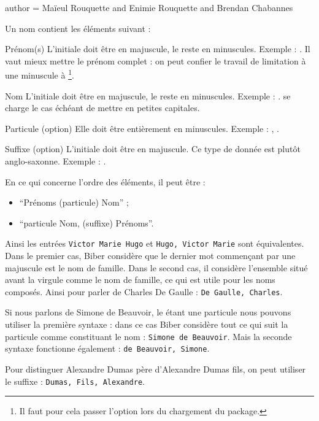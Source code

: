\begin{latexcode}
author = {Maïeul Rouquette and Enimie Rouquette and Brendan Chabannes}
\end{latexcode}

Un nom contient les éléments suivant :
\begin{choix}
	\item[Prénom(s)]L'initiale doit être en majuscule, le reste en minuscules. Exemple : . Il vaut mieux mettre le prénom complet : on peut confier le travail de limitation à une minuscule  à \footnote{Il faut pour cela passer l'option  lors du chargement du package.}.
	\item[Nom]L'initiale doit être en majuscule, le reste en minuscules. Exemple : .  se charge le cas échéant de mettre en petites capitales.
	\item[Particule (option)]Elle doit être entièrement en minuscules. Exemple : , .
	\item[Suffixe (option)]L'initiale doit être en majuscule. Ce type de donnée est plutôt anglo-saxonne. Exemple : .
\end{choix}


En ce qui concerne l'ordre des éléments, il  peut être :
\begin{itemize}
\item\enquote{Prénoms  (particule)  Nom} ;
\item\enquote{particule Nom, (suffixe) Prénoms}.
\end{itemize}

Ainsi les entrées \verb|Victor Marie Hugo| et \verb|Hugo, Victor Marie| sont équivalentes.
Dans le premier cas, Biber considère que le dernier mot commençant par une majuscule est le nom de famille. Dans le second cas, il considère l'ensemble situé avant la virgule comme le nom de famille, ce qui est utile pour les noms composés. Ainsi pour parler de Charles De Gaulle : \verb|De Gaulle, Charles|.

Si nous parlons de Simone de Beauvoir, le  étant une particule nous pouvons utiliser la première syntaxe : dans ce cas Biber considère tout ce qui suit la particule comme constituant le nom : \verb|Simone de Beauvoir|.
Mais la seconde syntaxe fonctionne également : \verb|de Beauvoir, Simone|.


Pour distinguer Alexandre Dumas père d'Alexandre Dumas fils, on peut utiliser le suffixe : \verb|Dumas, Fils, Alexandre|.


